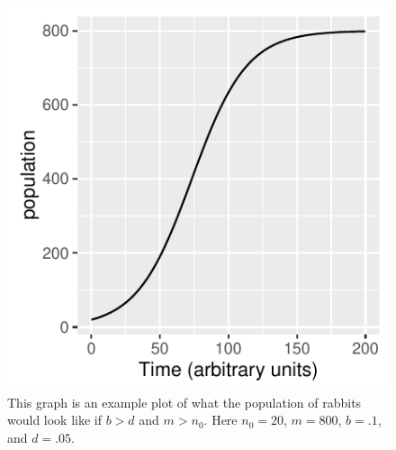 \documentclass[titlepage]{article}\usepackage[]{graphicx}\usepackage[]{color}
\makeatletter
\def\maxwidth{ %
  \ifdim\Gin@nat@width>\linewidth
    \linewidth
  \else
    \Gin@nat@width
  \fi
}
\newenvironment{knitrout}{}{} %
\makeatother
\begin{document}
\begin{figure}
\begin{knitrout}
\color{fgcolor}

{\centering \includegraphics[width=\maxwidth]{figure/unnamed-chunk-2-1} 

}



\end{knitrout}
\caption{This graph is an example plot of what the population of rabbits would look like if \(b > d\) and \(m > n_0\). Here \(n_0 = 20\), \(m = 800\), \(b = .1\), and \(d = .05\).}
\end{figure}
\end{document}
